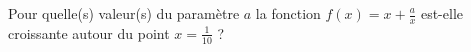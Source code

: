 
\begin{exercice}\label{exoDerive-0006}

    Pour quelle(s) valeur(s) du paramètre $a$ la fonction $f(x)=x+\frac{ a }{ x }$ est-elle croissante autour du point $x=\frac{1}{ 10 }$ ?

\end{exercice}
